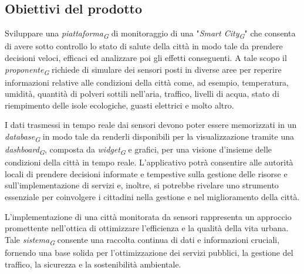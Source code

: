 \subsection{Obiettivi del prodotto}
Sviluppare una \textit{piattaforma}\textsubscript{\textit{G}} di monitoraggio di una "\textit{Smart City}\textsubscript{\textit{G}}" che consenta di avere sotto
controllo lo stato di salute della città in modo tale da prendere decisioni veloci, efficaci
ed analizzare poi gli effetti conseguenti.  
A tale scopo il \textit{proponente}\textsubscript{\textit{G}} richiede di simulare dei sensori posti in diverse aree per reperire
informazioni relative alle condizioni della città come, ad esempio, temperatura, umidità,
quantità di polveri sottili nell’aria, traffico, livelli di acqua, stato di riempimento delle isole ecologiche,
guasti elettrici e molto altro.  

I dati trasmessi in tempo reale dai sensori devono poter essere memorizzati in un \textit{database}\textsubscript{\textit{G}}
in modo tale da renderli disponibili per la visualizzazione tramite una \textit{dashboard}\textsubscript{\textit{G}}, composta da \textit{widget}\textsubscript{\textit{G}} e grafici, per una visione d’insieme delle condizioni della città in
tempo reale.  
L’applicativo potrà consentire alle autorità locali di prendere decisioni informate e tempestive sulla gestione delle risorse e sull’implementazione di servizi e, inoltre, si potrebbe
rivelare uno strumento essenziale per coinvolgere i cittadini nella gestione e nel miglioramento della città.
\vspace{0.3cm}  

L’implementazione di una città monitorata da sensori rappresenta un approccio promettente nell’ottica di ottimizzare l’efficienza e la qualità della vita urbana. Tale \textit{sistema}\textsubscript{\textit{G}} consente
una raccolta continua di dati e informazioni cruciali, fornendo una base solida per l’ottimizzazione dei servizi pubblici, la gestione del traffico, la sicurezza e la sostenibilità ambientale.  

